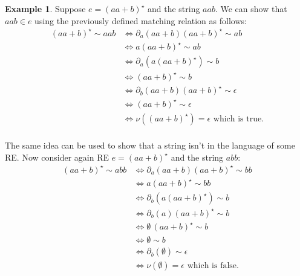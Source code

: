 \documentclass[fleqn,10pt]{SelfArx} %
\theoremstyle{definition}
\newtheorem{Example}{Example}
\begin{document}
\begin{Example}
    Suppose $e = (aa + b)^\star$ and the string $aab$. We can show that 
    $aab \in e$ using the previously defined matching relation as follows:
    \begin{align*}
        (aa + b)^\star \sim aab & \Leftrightarrow \partial_a (aa + b) (aa + b)^\star \sim ab \\
                                & \Leftrightarrow a(aa + b)^\star \sim ab \\
                                & \Leftrightarrow \partial_a(a(aa + b)^\star) \sim b \\
                                & \Leftrightarrow (aa + b)^\star \sim b \\
                                & \Leftrightarrow \partial_b(aa + b)(aa + b)^\star \sim \epsilon\\
                                & \Leftrightarrow (aa + b)^\star \sim \epsilon \\
                                & \Leftrightarrow \nu((aa + b)^\star) = \epsilon \text{ which is true.}\\ 
    \end{align*}
    
    The same idea can be used to show that a string isn't in the language of some RE. Now consider again
    RE $e = (aa + b)^\star$ and the string $abb$:
    \begin{align*}
        (aa + b)^\star \sim abb & \Leftrightarrow \partial_a (aa + b) (aa + b)^\star \sim bb \\
                                & \Leftrightarrow a(aa + b)^\star \sim bb \\
                                & \Leftrightarrow \partial_b (a(aa+ b)^\star) \sim b \\
                                & \Leftrightarrow \partial_b(a)(aa + b)^\star \sim b \\
                                & \Leftrightarrow \emptyset\,(aa + b)^\star \sim b   \\
                                & \Leftrightarrow \emptyset \sim b                   \\
                                & \Leftrightarrow \partial_b(\emptyset) \sim \epsilon \\
                                & \Leftrightarrow \nu(\emptyset) = \epsilon \text{ which is false.}\\
    \end{align*}    
\end{Example}    
\end{document}
